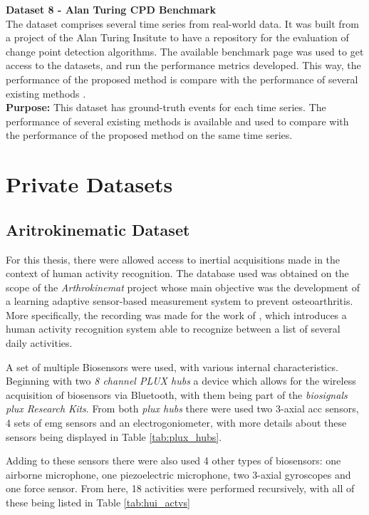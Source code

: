 \textbf{Dataset 8 - Alan Turing CPD Benchmark}\\
The dataset comprises several time series from real-world data. It was built from a project of the Alan Turing Insitute to have a repository for the evaluation of change point detection algorithms. The available benchmark page was used to get access to the datasets, and run the performance metrics developed. This way, the performance of the proposed method is compare with the performance of several existing methods \cite{cpd_alan}.\\

\textbf{Purpose:} This dataset has ground-truth events for each time series. The performance of several existing methods is available and used to compare with the performance of the proposed method on the same time series.

\section{Private Datasets}

\subsection{Aritrokinematic Dataset}

For this thesis, there were allowed access to inertial acquisitions made in the context of human activity recognition. The database used was obtained on the scope of the \textit{Arthrokinemat} project whose main objective was the development of a learning adaptive sensor-based measurement system to prevent osteoarthritis\cite{arthrokinemat}. More specifically, the recording was made for the work of \cite{Liu2019}, which introduces a human activity recognition system able to recognize between a list of several daily activities.

A set of multiple Biosensors were used, with various internal characteristics. Beginning with two \textit{8 channel PLUX hubs} a device which allows for the wireless acquisition of biosensors via Bluetooth, with them being part of the \textit{biosignals plux Research Kits}. From both \textit{plux hubs} there were used two 3-axial \gls{acc} sensors, 4 sets of \gls{emg} sensors and an electrogoniometer, with more details about these sensors being displayed in Table \ref{tab:plux_hubs}.

Adding to these sensors there were also used 4 other types of biosensors: one airborne microphone, one piezoelectric microphone, two 3-axial gyroscopes and one force sensor. From here, 18 activities were performed recursively, with all of these being listed in Table \ref{tab:hui_actvs}


